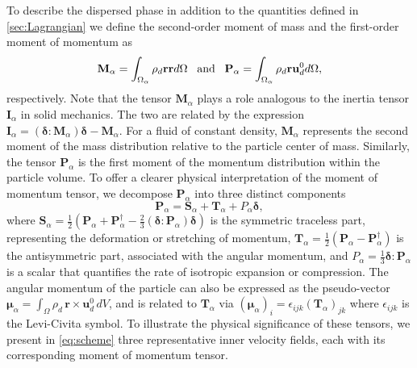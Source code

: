 To describe the dispersed phase in addition to the quantities defined in \ref{sec:Lagrangian} we define the second-order moment of mass and the first-order moment of momentum as 
\begin{equation}
    \textbf{M}_\alpha 
    = \intO{ \rho_d \textbf{r} \textbf{r} }
    \;\;\;\text{and}\;\;\;
    \textbf{P}_\alpha 
    = \intO{ \rho_d \textbf{r} \textbf{u}_d^0 },
    \label{eq:first_moment_of_momentum_def}
\end{equation}
respectively. 
Note that the tensor $\textbf{M}_\alpha$ plays a role analogous to the inertia tensor $\textbf{I}_\alpha$ in solid mechanics. 
The two are related by the expression  $\textbf{I}_\alpha = (\bm\delta : \textbf{M}_\alpha)\bm\delta - \textbf{M}_\alpha$.
For a fluid of constant density, $\textbf{M}_\alpha$ represents the second moment of the mass distribution relative to the particle center of mass.
Similarly, the tensor $\textbf{P}_\alpha$ is the first moment of the momentum distribution within the particle volume. 
To offer a clearer physical interpretation of the moment of momentum tensor, we decompose $\textbf{P}_\alpha$ into three distinct components  
\begin{equation}
\textbf{P}_\alpha = \textbf{S}_\alpha + \textbf{T}_\alpha + P_\alpha \bm\delta,
\end{equation}
where $\textbf{S}_\alpha = \frac{1}{2}\left(\textbf{P}_\alpha + \textbf{P}_\alpha^\dagger - \frac{2}{3}(\bm\delta:\textbf{P}_\alpha)\bm\delta\right)$ is the symmetric traceless part, representing the  deformation or stretching of momentum,
$\textbf{T}_\alpha = \frac{1}{2}(\textbf{P}_\alpha - \textbf{P}_\alpha^\dagger)$ is the antisymmetric part, associated with the angular momentum,
and $P_\alpha = \frac{1}{3} \bm\delta : \textbf{P}_\alpha$ is a scalar that quantifies the rate of isotropic expansion or compression. 
The angular momentum of the particle can also be expressed as the pseudo-vector  
$\bm\mu_\alpha = \int_\Omega \rho_d\, \textbf{r} \times \textbf{u}_d^0 \, dV$,
and is related to $\textbf{T}_\alpha$ via $(\bm\mu_\alpha)_i = \epsilon_{ijk} (\textbf{T}_\alpha)_{jk}$ %
where $\epsilon_{ijk}$ is the Levi-Civita symbol.
To illustrate the physical significance of these tensors, we present in \ref{eq:scheme} three representative inner velocity fields, each with its corresponding moment of momentum tensor.
